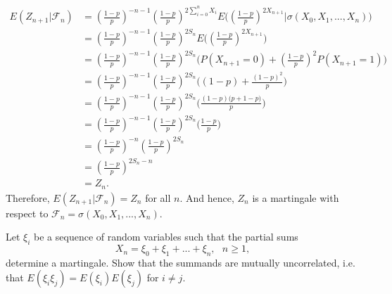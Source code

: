 \documentclass[10pt]{amsart}
\begin{document}
\begin{align*}
E (Z_{n + 1} | \mathcal F_n) &= \left(\frac{1-p}{p} \right)^{- n - 1} \left(\frac{1-p}{p} \right)^{2\sum_{i=0}^{n} X_i} E \Bigg(\left(\frac{1-p}{p} \right)^{2X_{n + 1}} \Bigg| \sigma(X_0, X_1, ...,  X_n)\Bigg) \\
	&= \left(\frac{1-p}{p} \right)^{- n - 1} \left(\frac{1-p}{p} \right)^{2S_n} E \Bigg(\left(\frac{1-p}{p} \right)^{2X_{n + 1}}\Bigg) \\
	&= \left(\frac{1-p}{p} \right)^{- n - 1} \left(\frac{1-p}{p} \right)^{2S_n} \Bigg(P(X_{n + 1} = 0)  + \left(\frac{1-p}{p} \right)^2P(X_{n + 1} = 1)\Bigg) \\
	&= \left(\frac{1-p}{p} \right)^{- n - 1} \left(\frac{1-p}{p} \right)^{2S_n} \Bigg((1 - p)  + \frac{(1-p)^2}{p}\Bigg) \\
	&= \left(\frac{1-p}{p} \right)^{- n - 1} \left(\frac{1-p}{p} \right)^{2S_n} \Bigg(\frac{(1 - p)\big(p + 1 - p\big)}{p}\Bigg) \\
	&= \left(\frac{1-p}{p} \right)^{- n - 1} \left(\frac{1-p}{p} \right)^{2S_n} \Bigg(\frac{1 - p}{p} \Bigg) \\
	&= \left(\frac{1-p}{p} \right)^{- n} \left(\frac{1-p}{p} \right)^{2S_n} \\
	&=\left(\frac{1-p}{p} \right)^{2S_n - n} \\
	&= Z_n.
\end{align*}
Therefore, $E (Z_{n + 1} | \mathcal F_n)  = Z_n$ for all $n$.
And hence, $Z_n$ is a martingale with respect to $\mathcal{F}_n = \sigma(X_0, X_1, . . . , X_n )$.


\newpage

 Let $\xi_i$ be a sequence of random variables such that the partial sums 
$$X_n=\xi_0+\xi_1+...+\xi_n, \,\,\,\, n\geq 1,$$
determine a martingale. Show that the summands are mutually uncorrelated, i.e. that $E(\xi_i\xi_j)=E(\xi_i)E(\xi_j)$ for $i\neq j$. \\
\end{document}
